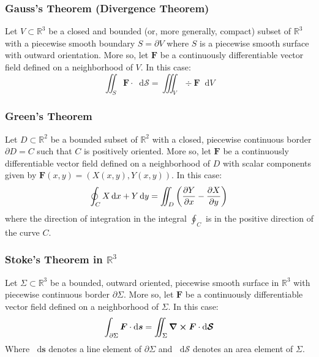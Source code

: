 \documentclass[11pt, a4paper]{article}
\newcommand{\diff}{\mathop{}\!\mathrm{d}} %
\begin{document}
\subsubsection{Gauss's Theorem (Divergence Theorem)}
Let $ V \subset \mathbb{R}^3 $ be a closed and bounded (or, more generally, compact) subset of $ \mathbb{R}^3 $ with a piecewise smooth boundary $ S = \partial V $ where $ S $ is a piecewise smooth surface with outward orientation. More so, let $ \bm{F} $ be a continuously differentiable vector field defined on a neighborhood of $ V $. In this case:
\begin{equation*}
	\iint_S \bm{F} \cdot \diff \bm{\mathcal{S}} = \iiint_V \div{\bm{F}} \diff V
\end{equation*}

\subsubsection{Green's Theorem}
Let $ D \subset \mathbb{R}^2 $ be a bounded subset of $ \mathbb{R}^2 $ with a closed, piecewise continuous border $ \partial D = C $ such that $ C $ is positively oriented. More so, let $ \bm{F} $ be a continuously differentiable vector field defined on a neighborhood of $ D $ with scalar components given by $ \bm{F}(x, y) = (X(x, y), Y(x, y)) $. In this case:
\begin{equation*}
	\oint_{C} X \diff x + Y \diff y = \iint_D \left(\pdv{Y}{x} - \pdv{X}{y} \right)
\end{equation*}
where the direction of integration in the integral $ \oint_C $ is in the positive direction of the curve $ C $.

\subsubsection{Stoke's Theorem in $ \mathbb{R}^3 $}
Let $ \Sigma \subset \mathbb{R}^3 $ be a bounded, outward oriented, piecewise smooth surface in $ \mathbb{R}^3 $ with piecewise continuous border $ \partial \Sigma $. More so, let $ \bm{F} $ be a continuously differentiable vector field defined on a neighborhood of $ \Sigma $. In this case:
\begin{equation*}
	\int_{\partial \Sigma} \bm{F} \cdot \diff \bm{s} = \iint_{\Sigma} \curl{\bm{F}} \cdot \diff \bm{\mathcal{S}}
\end{equation*}
Where $ \diff \bm{s} $ denotes a line element of $ \partial \Sigma $  and $ \diff \bm{\mathcal{S}} $ denotes an area element of $ \Sigma $.
\end{document}
